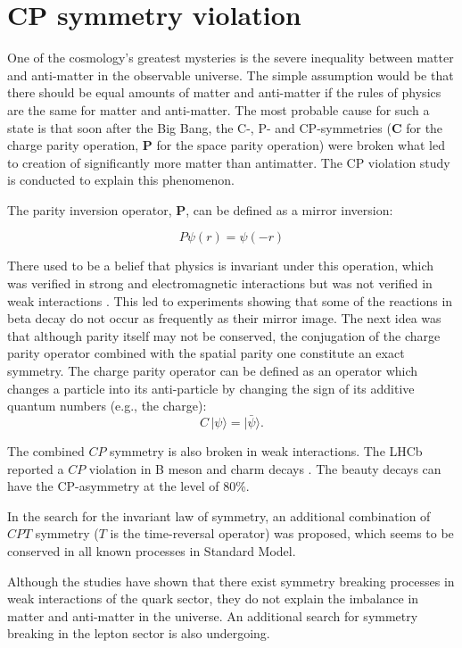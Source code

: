 \section{CP symmetry violation}
One of the cosmology's greatest mysteries is the severe inequality between matter and anti-matter in the observable universe. The simple assumption would be that there should be equal amounts of matter and anti-matter if the rules of physics are the same for matter and anti-matter.
The most probable cause for such a state is that soon after the Big Bang, the C-, P- and CP-symmetries (\textbf{C} for the charge parity operation, \textbf{P} for the space parity operation) were broken what led to creation of significantly more matter than antimatter.
The CP violation study is conducted to explain this phenomenon.

The parity inversion operator, \textbf{P}, can be defined as a mirror inversion:

$$
P\psi(r) = \psi(-r)
$$

There used to be a belief that physics is invariant under this operation, which was verified in strong and electromagnetic interactions but was not verified in weak interactions \cite{PhysRev.104.254}.
This led to experiments showing that some of the reactions in beta decay do not occur as frequently as their mirror image.
The next idea was that although parity itself may not be conserved, the conjugation of the charge parity operator combined with the spatial parity one constitute an exact symmetry.
The charge parity operator can be defined as an operator which changes a particle into its anti-particle by changing the sign of its additive quantum numbers (e.g., the charge):
$$
C \, |\psi\rangle = | \bar{\psi}\rangle.
$$

The combined $CP$ symmetry is also broken \cite{PhysRevLett.13.138} in weak interactions. The LHCb reported a $CP$ violation in B meson \cite{PhysRevLett.110.221601} and charm decays \cite{PhysRevLett.122.211803}. The beauty decays can have the CP-asymmetry at the level of 80\%.

In the search for the invariant law of symmetry, an additional combination of $CPT$ symmetry ($T$ is the time-reversal operator) was proposed, which seems to be conserved in all known processes in Standard Model.

Although the studies have shown that there exist symmetry breaking processes in weak interactions of the quark sector, they do not explain the imbalance in matter and anti-matter in the universe.
An additional search for symmetry breaking in the lepton sector is also undergoing.


